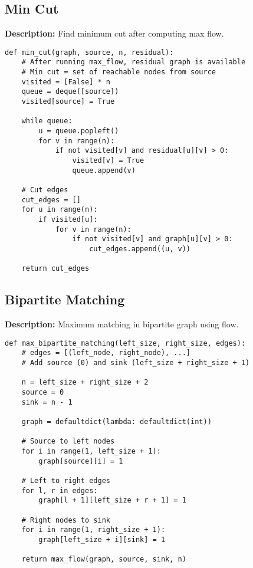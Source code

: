 \subsection{Min Cut}
\textbf{Description:} Find minimum cut after computing max flow.

\begin{lstlisting}
def min_cut(graph, source, n, residual):
    # After running max_flow, residual graph is available
    # Min cut = set of reachable nodes from source
    visited = [False] * n
    queue = deque([source])
    visited[source] = True
    
    while queue:
        u = queue.popleft()
        for v in range(n):
            if not visited[v] and residual[u][v] > 0:
                visited[v] = True
                queue.append(v)
    
    # Cut edges
    cut_edges = []
    for u in range(n):
        if visited[u]:
            for v in range(n):
                if not visited[v] and graph[u][v] > 0:
                    cut_edges.append((u, v))
    
    return cut_edges
\end{lstlisting}

\subsection{Bipartite Matching}
\textbf{Description:} Maximum matching in bipartite graph using flow.

\begin{lstlisting}
def max_bipartite_matching(left_size, right_size, edges):
    # edges = [(left_node, right_node), ...]
    # Add source (0) and sink (left_size + right_size + 1)
    
    n = left_size + right_size + 2
    source = 0
    sink = n - 1
    
    graph = defaultdict(lambda: defaultdict(int))
    
    # Source to left nodes
    for i in range(1, left_size + 1):
        graph[source][i] = 1
    
    # Left to right edges
    for l, r in edges:
        graph[l + 1][left_size + r + 1] = 1
    
    # Right nodes to sink
    for i in range(1, right_size + 1):
        graph[left_size + i][sink] = 1
    
    return max_flow(graph, source, sink, n)
\end{lstlisting}
